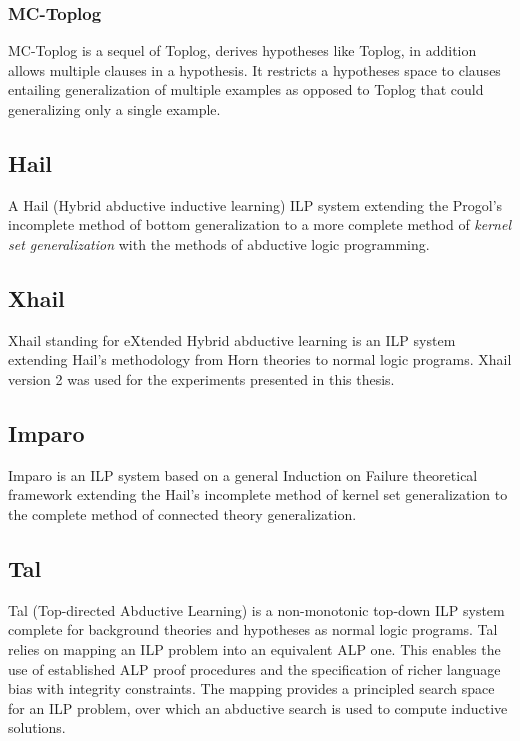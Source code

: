 \subsubsection{MC-Toplog\cite{muggleton2012mc}}
MC-Toplog is a sequel of Toplog, derives hypotheses like Toplog, in addition allows multiple clauses in a hypothesis. It restricts a hypotheses space to clauses entailing generalization of multiple examples as opposed to Toplog that could generalizing only a single example.

\subsection{Hail\cite{ray2003hybrid}\cite{ray2005phdHybrid}}
A Hail (Hybrid abductive inductive learning) ILP system extending the Progol's incomplete method of bottom generalization to a more complete method of \emph{kernel set generalization} with the methods of abductive logic programming.

\subsection{Xhail\cite{ray2009nonmonotonic}}
Xhail standing for eXtended Hybrid abductive learning is an ILP system extending Hail's methodology from Horn theories to normal logic programs.
Xhail version 2 was used for the experiments presented in this thesis.

\subsection{Imparo\cite{kimber2012learning}}
Imparo is an ILP system based on a general Induction on Failure theoretical framework extending the Hail's incomplete method of kernel set generalization to the complete method of connected theory generalization.

\subsection{Tal\cite{corapi2010inductive}\cite{corapi2011tal}}
Tal (Top-directed Abductive Learning) is a non-monotonic top-down ILP system complete for background theories and hypotheses as normal logic programs. 
Tal relies on mapping an ILP problem into an equivalent ALP one. This enables the
use of established ALP proof procedures and the specification of richer language bias with integrity constraints. The mapping provides a principled search space for an ILP problem, over which an abductive search is used to compute inductive solutions.

